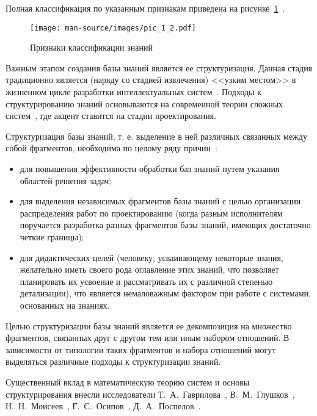 Полная классификация по указанным признакам приведена на \mbox{рисунке \ref{pic_1.2}~\cite{Gavrilova2016, Tarasov2003}.} 

\begin{figure}[H]
\begin{center}
\texttt{[image: man-source/images/pic\_1\_2.pdf]}\\[2mm]
\caption{Признаки классификации знаний}
\label{pic_1.2}
\end{center}
\end{figure}

Важным этапом создания базы знаний является ее структуризация. Данная стадия традиционно является (наряду со стадией извлечения) <<узким местом>> в жизненном цикле разработки интеллектуальных систем~\cite{Gavrilova2008}. Подходы к структурированию знаний основываются на современной теории сложных систем~\cite{Wasson2005}, где акцент ставится на стадии проектирования. 

Структуризация базы знаний, т. е. выделение в ней различных связанных между собой фрагментов, необходима по целому ряду причин~\cite{Gavrilova2016}:
\begin{itemize}
  \item для повышения эффективности обработки баз знаний путем указания областей решения задач;
  \item для выделения независимых фрагментов базы знаний с целью организации распределения работ по проектированию (когда разным исполнителям поручается разработка разных фрагментов базы знаний, имеющих достаточно четкие границы);
  \item для дидактических целей (человеку, усваивающему некоторые знания, желательно иметь своего рода оглавление этих знаний, что позволяет планировать их усвоение и рассматривать их с различной степенью детализации), что является немаловажным фактором при работе с системами, основанных на знаниях.
\end{itemize}

Целью структуризации базы знаний является ее декомпозиция на множество фрагментов, связанных друг с другом тем или иным набором отношений. В зависимости от типологии таких фрагментов и набора отношений могут выделяться различные подходы к структуризации знаний.

Существенный вклад в математическую теорию систем и основы структурирования внесли исследователи Т.~А.~Гаврилова~\cite{Gavrilova1992},  В.~М.~Глушков~\cite{Glushkov1964}, Н.~Н.~Моисеев~\cite{Moiseev1981}, Г.~С.~Осипов~\cite{Osipov1997, Osipov2015}, Д.~А.~Поспелов~\cite{Pospelov1986}.

